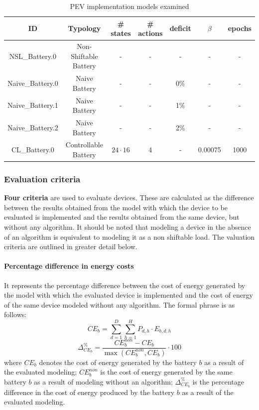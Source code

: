 \begin{table}[h]
    \center
    \caption{PEV implementation models examined}
    \label{tab:modelli}
    \begin{tabular}{c|c|c|c|c|c|c}
        \hline
        \hline
        ID & Typology & \# states & \# actions & deficit & $\beta$ & epochs\\
        \hline
        NSL\_Battery.0 & Non-Shiftable Battery & - & - & - & - & -\\
        \hline
        Naive\_Battery.0 & Naive Battery & - & - & 0\% & - & -\\
        \hline
        Naive\_Battery.1 & Naive Battery & - & - & 1\% & - & - \\
        \hline
        Naive\_Battery.2 & Naive Battery & - & - & 2\% & - & -\\
        \hline
        CL\_Battery.0 & Controllable Battery & $24 \cdot 16$ & 4 & - & 0.00075 & 1000\\
        \hline
        \hline
    \end{tabular}
\end{table}

\subsubsection{Evaluation criteria}
\textbf{Four criteria} are used to evaluate devices. These are calculated as the difference between the results obtained from the model with which the device to be evaluated is implemented and the results obtained from the same device, but without any algorithm. It should be noted that modeling a device in the absence of an algorithm is equivalent to modeling it as a non shiftable load. The valuation criteria are outlined in greater detail below.

\paragraph{Percentage difference in energy costs}
It represents the percentage difference between the cost of energy generated by the model with which the evaluated device is implemented and the cost of energy of the same device modeled without any algorithm. The formal phrase is as follows:
\begin{equation}
    CE_b = \sum^{D}_{d = 1}\sum^{H}_{h = 1} P_{d,h} \cdot E_{b, d,h}
\end{equation}
\begin{equation}
    \Delta ^\%_{CE_b} = \frac{CE^{non}_b - CE_b}{\max(CE^{non}_b, CE_b)} \cdot 100
\end{equation}
where $CE_b$ denotes the cost of energy generated by the battery $b$ as a result of the evaluated modeling; $CE^{non}_b$ is the cost of energy generated by the same battery $b$ as a result of modeling without an algorithm; $\Delta ^\%_{CE_b}$ is the percentage difference in the cost of energy produced by the battery $b$ as a result of the evaluated modeling.

